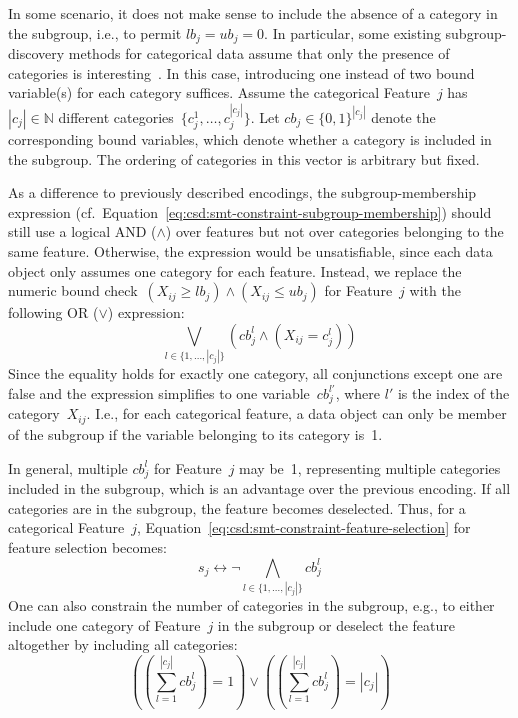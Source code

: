 \documentclass{article}
\theoremstyle{definition}
\begin{document}
In some scenario, it does not make sense to include the absence of a category in the subgroup, i.e., to permit $\mathit{lb}_j = \mathit{ub}_j = 0$.
In particular, some existing subgroup-discovery methods for categorical data assume that only the presence of categories is interesting~\cite{atzmueller2015subgroup}.
In this case, introducing one instead of two bound variable(s) for each category suffices.
Assume the categorical Feature~$j$ has $|c_j| \in \mathbb{N}$ different categories~$\{c^1_j, \dots, c^{|c_j|}_j\}$.
Let $\mathit{cb}_j \in \{0, 1\}^{|c_j|}$ denote the corresponding bound variables, which denote whether a category is included in the subgroup.
The ordering of categories in this vector is arbitrary but fixed.

As a difference to previously described encodings, the subgroup-membership expression (cf.~Equation~\ref{eq:csd:smt-constraint-subgroup-membership}) should still use a logical AND ($\land$) over features but not over categories belonging to the same feature.
Otherwise, the expression would be unsatisfiable, since each data object only assumes one category for each feature.
Instead, we replace the numeric bound check~$\left( X_{ij} \geq \mathit{lb}_j \right) \land \left( X_{ij} \leq \mathit{ub}_j \right)$ for Feature~$j$ with the following OR ($\lor$) expression:
%
\begin{equation}
	\bigvee_{l \in \{1, \dots, |c_j|\}} \left( \mathit{cb}^l_j \land \left(  X_{ij} = c^l_j \right) \right)
	\label{eq:csd:category-constraint:or}
\end{equation}
%
Since the equality holds for exactly one category, all conjunctions except one are false and the expression simplifies to one variable~$\mathit{cb}^{l'}_j$, where $l'$ is the index of the category~$X_{ij}$.
I.e., for each categorical feature, a data object can only be member of the subgroup if the variable belonging to its category is~1.

In general, multiple $\mathit{cb}^l_j$ for Feature~$j$ may be~1, representing multiple categories included in the subgroup, which is an advantage over the previous encoding.
If all categories are in the subgroup, the feature becomes deselected.
Thus, for a categorical Feature~$j$, Equation~\ref{eq:csd:smt-constraint-feature-selection} for feature selection becomes:
%
\begin{equation}
	s_j \leftrightarrow \lnot \bigwedge_{l \in \{1, \dots, |c_j|\}} \mathit{cb}^l_j
	\label{eq:csd:category-constraint:feature-selection}
\end{equation}
%
One can also constrain the number of categories in the subgroup, e.g., to either include one category of Feature~$j$ in the subgroup or deselect the feature altogether by including all categories:
%
\begin{equation}
	 \left( \left( \sum_{l=1}^{|c_j|} \mathit{cb}^l_j \right) = 1 \right) \lor \left( \left( \sum_{l=1}^{|c_j|} \mathit{cb}^l_j \right) = |c_j| \right)
	\label{eq:csd:category-constraint:cardinality}
\end{equation}
\end{document}
